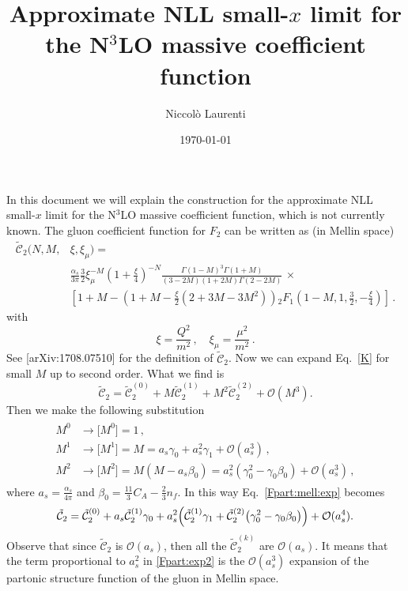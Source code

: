 \documentclass[a4paper]{article}
\title{Approximate NLL small-$x$ limit for the N$^3$LO massive coefficient function}
\author{Niccolò Laurenti}
\date{\today}
\newcommand{\ord}[1]{\mathcal{O} (a_s^{#1})}
\newcommand{\C}[0]{\tilde{\mathcal{C}}}
\begin{document}
	\maketitle
	In this document we will explain the construction for the approximate NLL small-$x$ limit for the N$^3$LO massive coefficient function, which is not currently known.
	The gluon coefficient function for $F_2$ can be written as (in Mellin space)
	\begin{equation}
		\label{K}
		\begin{split}
		\tilde{\mathcal{C}}_{2}(N, M,& \xi, \xi_\mu) = \\
		&\frac{\alpha_s}{3 \pi} \frac{3}{2} \xi_\mu^{-M} \left(1+\frac{\xi}{4}\right)^{-N} \frac{\Gamma(1-M)^3 \Gamma(1+M)}{(3-2M)(1+2M)\Gamma(2-2M)}\, \times \\
		& \left[1+M - \left( 1 + M - \frac{\xi}{2}(2+3M - 3M^2) \right){}_2F_1\left(1-M,1,\frac{3}{2}, -\frac{\xi}{4}\right)\right]\,.
		\end{split}
	\end{equation}
	with
	\begin{equation}
		\xi = \frac{Q^2}{m^2}\,, \quad \xi_\mu = \frac{\mu^2}{m^2}\,.
	\end{equation}
See [arXiv:1708.07510] for the definition of $\C_2$.
Now we can expand Eq.~\eqref{K} for small $M$ up to second order. What we find is
\begin{equation}\label{Fpart:mell:exp}
	\C_2 = \C_2^{(0)}+ M \C_2^{(1)}+ M^2 \C_2^{(2)}+\mathcal{O}(M^3).
\end{equation}
Then we make the following substitution
\begin{align}
	\begin{split}
	M^0 & \rightarrow \bigl[M^0\bigr] =1 \,,\\
	M^1 & \rightarrow \bigl[M^1\bigr] =M= a_s \gamma_0 +a_s^2 \gamma_1 +\mathcal{O}(a_s^3) \,,\\
	M^2 & \rightarrow \bigl[M^2\bigr]=M(M-a_s\beta_0) = a_s^2(\gamma^2_0- \gamma_0\beta_0) +\mathcal{O}(a_s^3) \,,
	\end{split}
\end{align}
where $a_s = \frac{\alpha_s}{4\pi}$ and $\beta_0 = \frac{11}{3} C_A - \frac{2}{3} n_f$.
In this way Eq.~\eqref{Fpart:mell:exp} becomes
\begin{equation}\label{Fpart:exp2}
	\C_2=\C_2^{(0)} + a_s \C_2^{(1)} \gamma_0+ a_s^2\Bigl(\C_2^{(1)} \gamma_1 + \C_2^{(2)}\bigl(\gamma_0^2-\gamma_0\beta_0\bigr)\Bigr)+\mathcal{O}(a_s^4).
\end{equation}
Observe that since $\C_2$ is $\ord{}$, then all the $\C_2^{(k)}$ are $\ord{}$. It means that the term proportional to $a_s^2$ in \eqref{Fpart:exp2} is the $\ord{3}$ expansion of the partonic structure function of the gluon in Mellin space.
\end{document}
